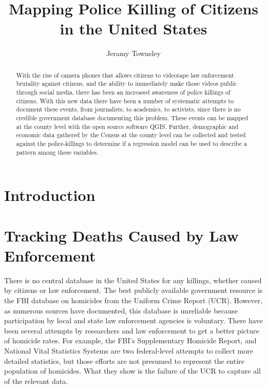 \documentclass[sigconf]{acmart}
\begin{document}
\title{Mapping Police Killing of Citizens in the United States}

\author{Jeramy Townsley}


\begin{abstract}
With the rise of camera phones that allows citizens to videotape law enforcement brutality against citizens, and the ability to immediately make those videos public through social media, there has been an increased awareness of police killings of citizens.  With this new data there have been a number of systematic attempts to document these events, from journalists, to academics, to activists, since there is no credible government database documenting this problem. These events can be mapped at the county level with the open source software QGIS.  Further, demographic and economic data gathered by the Census at the county level can be collected and tested against the police-killings to determine if a regression model can be used to describe a pattern among these variables. 
\end{abstract}


\maketitle

\section{Introduction}



\section{Tracking Deaths Caused by Law Enforcement}
There is no central database in the United States for any killings, whether caused by citizens or law enforcement.  The best publicly available government resource is the FBI database on homicides from the Uniform Crime Report (UCR).  However, as numerous sources have documented, this database is unreliable because participation by local and state law enforcement agencies is voluntary. \cite{currie16,pridemore05,dalton17} There have been several attempts by researchers and law enforcement to get a better picture of homicide rates.  For example, the FBI's Supplementary Homicide Report, and National Vital Statistics Systems are two federal-level attempts to collect more detailed statistics, but those efforts are not presumed to represent the entire population of homicides. \cite{pridemore05} What they show is the failure of the UCR to capture all of the relevant data.
\end{document}
